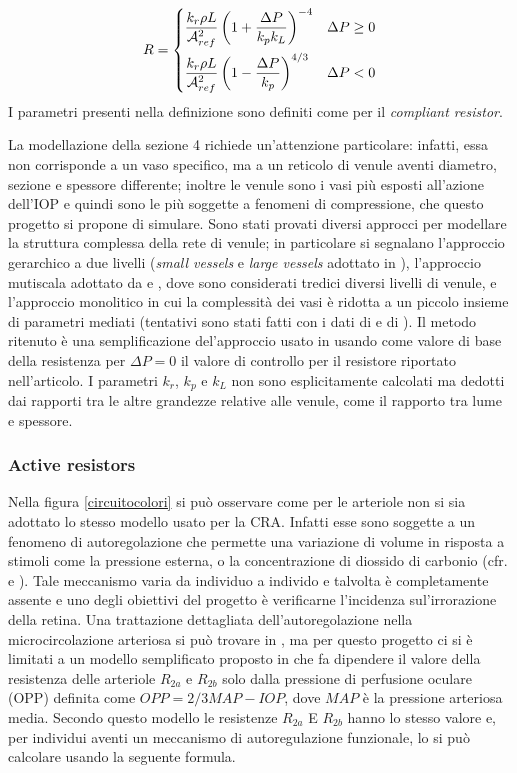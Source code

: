 \documentclass{article}
\begin{document}
\begin{equation}
R = \begin{dcases}
\frac{k_r \rho L}{\mathcal{A}_{ref}^2}\left( 1 + \frac{\Delta P}{k_p k_L}\right)^{-4} & \Delta P \ge 0\\
\frac{k_r \rho L}{\mathcal{A}_{ref}^2}\left( 1- \frac{\Delta P}{k_p}\right)^{4/3} & \Delta P < 0\\
\end{dcases}
\label{starlingR}
\end{equation}
I parametri presenti nella definizione sono definiti come per il \textit{compliant resistor}.

La modellazione della sezione 4 richiede un'attenzione particolare: infatti, essa non corrisponde a un vaso specifico, ma a un reticolo di venule aventi diametro, sezione e spessore differente; inoltre le venule sono i vasi più esposti all'azione dell'IOP e quindi sono le più soggette a fenomeni di compressione, che questo progetto si propone di simulare.
Sono stati provati diversi approcci per modellare la struttura complessa della rete di venule; in particolare si segnalano l'approccio gerarchico a due livelli (\textit{small vessels} e \textit{large vessels} adottato in \cite{Libro}), l'approccio mutiscala adottato da \cite{art1} e \cite{Tesi}, dove sono considerati tredici diversi livelli di venule, e l'approccio monolitico in cui la complessità dei vasi è ridotta a un piccolo insieme di parametri mediati (tentativi sono stati fatti con i dati di \cite{art2} e di \cite{Duker}).
Il metodo ritenuto è una semplificazione del'approccio usato in \cite{art1} usando come valore di base della resistenza per $\Delta P = 0$ il valore di controllo per il resistore riportato nell'articolo.
I parametri $k_r$, $k_p$ e $k_L$ non sono esplicitamente calcolati ma dedotti dai rapporti tra le altre grandezze relative alle venule, come il rapporto tra lume e spessore.

\subsubsection*{Active resistors}
Nella figura \ref{circuitocolori} si può osservare come per le arteriole non si sia adottato lo stesso modello usato per la CRA.
Infatti esse sono soggette a un fenomeno di autoregolazione che permette una variazione di volume in risposta a stimoli come la pressione esterna, o la concentrazione di diossido di carbonio (cfr. \cite{art1} e \cite{Tesi}).
Tale meccanismo varia da individuo a individo e talvolta è completamente assente e uno degli obiettivi del progetto è verificarne l'incidenza sul'irrorazione della retina.
Una trattazione dettagliata dell'autoregolazione nella microcircolazione arteriosa si può trovare in \cite{Tesi}, ma per questo progetto ci si è limitati a un modello semplificato proposto in \cite{art1} che fa dipendere il valore della resistenza delle arteriole $R_{2a}$ e $R_{2b}$ solo dalla pressione di perfusione oculare (OPP) definita come $OPP = 2/3 MAP - IOP$, dove $MAP$ è la pressione arteriosa media.
Secondo questo modello le resistenze $R_{2a}$ E $R_{2b}$ hanno lo stesso valore e, per individui aventi un meccanismo di autoregulazione funzionale, lo si può calcolare usando la seguente formula.
\end{document}
